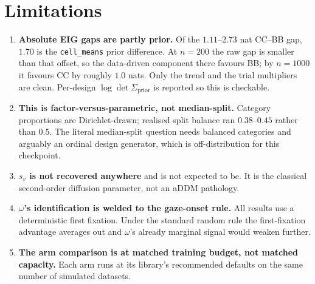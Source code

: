 \documentclass[11pt]{article}
\begin{document}
\section{Limitations}

\begin{enumerate}
\item \textbf{Absolute EIG gaps are partly prior.} Of the $1.11$--$2.73$ nat CC--BB
gap, $1.70$ is the \texttt{cell\_means} prior difference. At $n{=}200$ the raw gap is
smaller than that offset, so the data-driven component there favours BB; by $n{=}1000$
it favours CC by roughly $1.0$ nats. Only the trend and the trial multipliers are
clean. Per-design $\log\det\Sigma_{\text{prior}}$ is reported so this is checkable.

\item \textbf{This is factor-versus-parametric, not median-split.} Category proportions
are Dirichlet-drawn; realised split balance ran $0.38$--$0.45$ rather than $0.5$. The
literal median-split question needs balanced categories and arguably an ordinal design
generator, which is off-distribution for this checkpoint.

\item \textbf{$s_v$ is not recovered anywhere} and is not expected to be. It is the
classical second-order diffusion parameter, not an aDDM pathology.

\item \textbf{$\omega$'s identification is welded to the gaze-onset rule.} All results
use a deterministic first fixation. Under the standard random rule the first-fixation
advantage averages out and $\omega$'s already marginal signal would weaken further.

\item \textbf{The arm comparison is at matched training budget, not matched capacity.}
Each arm runs at its library's recommended defaults on the same number of simulated
datasets.
\end{enumerate}
\end{document}
